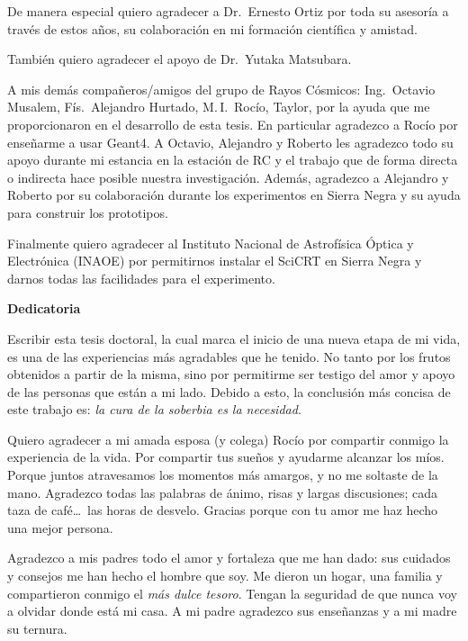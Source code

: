 De manera especial quiero agradecer a Dr.\, Ernesto Ortiz por toda su asesoría a través de estos años, su colaboración en mi formación científica y amistad.

También quiero agradecer el apoyo de Dr.\, Yutaka Matsubara.

A mis demás compañeros/amigos del grupo de Rayos Cósmicos: Ing.\, Octavio Musalem, Fís.\, Alejandro Hurtado, M.\,I.\, Rocío, Taylor, por la ayuda que me proporcionaron en el desarrollo de esta tesis. En particular agradezco a Rocío por enseñarme a usar Geant4. A Octavio, Alejandro y Roberto les agradezco todo su apoyo durante mi estancia en la estación de RC y el trabajo que de forma directa o indirecta hace posible nuestra investigación. Además, agradezco a Alejandro y Roberto por su colaboración durante los experimentos en Sierra Negra y su ayuda para construir los prototipos.

Finalmente quiero agradecer al Instituto Nacional de Astrofísica Óptica y Electrónica (INAOE) por permitirnos instalar el SciCRT en Sierra Negra y darnos todas las facilidades para el experimento.

\newpage
\thispagestyle{empty}
\vspace*{\fill}
\begin{center}
\textbf{\Large{Dedicatoria}}
\end{center}

Escribir esta tesis doctoral, la cual marca el inicio de una nueva etapa de mi vida, es una de las experiencias más agradables que he tenido. No tanto por los frutos obtenidos a partir de la misma, sino por permitirme ser testigo del amor y apoyo de las personas que están a mi lado. Debido a esto, la conclusión más concisa de este trabajo es: \emph{la cura de la soberbia es la necesidad}.

Quiero agradecer a mi amada esposa (y colega) Rocío por compartir conmigo la experiencia de la vida. Por compartir tus sueños y ayudarme alcanzar los míos. Porque juntos atravesamos los momentos más amargos, y no me soltaste de la mano. Agradezco todas las palabras de ánimo, risas y largas discusiones; cada taza de café\ldots\, las horas de desvelo. Gracias porque con tu amor me haz hecho una mejor persona.

Agradezco a mis padres todo el amor y fortaleza que me han dado: sus cuidados y consejos me han hecho el hombre que soy. Me dieron un hogar, una familia y compartieron conmigo el \emph{más dulce tesoro}. Tengan la seguridad de que nunca voy a olvidar donde está mi casa. A mi padre agradezco sus enseñanzas y a mi madre su ternura.

